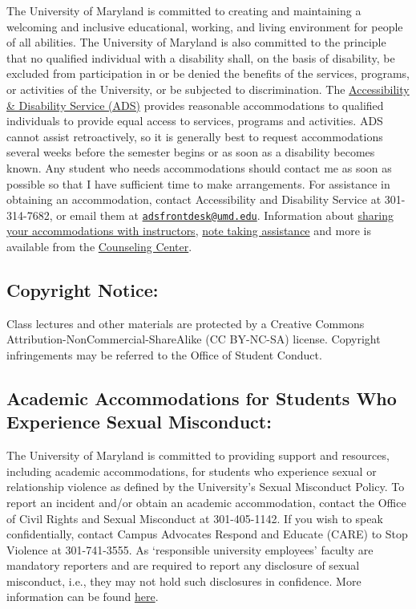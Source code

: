 \documentclass[
]{book}
\begin{document}
The University of Maryland is committed to creating and maintaining a welcoming and inclusive educational, working, and living environment for people of all abilities. The University of Maryland is also committed to the principle that no qualified individual with a disability shall, on the basis of disability, be excluded from participation in or be denied the benefits of the services, programs, or activities of the University, or be subjected to discrimination. The \href{https://www.counseling.umd.edu/ads/}{Accessibility \& Disability Service (ADS)} provides reasonable accommodations to qualified individuals to provide equal access to services, programs and activities. ADS cannot assist retroactively, so it is generally best to request accommodations several weeks before the semester begins or as soon as a disability becomes known. Any student who needs accommodations should contact me as soon as possible so that I have sufficient time to make arrangements. For assistance in obtaining an accommodation, contact Accessibility and Disability Service at 301-314-7682, or email them at \href{mailto:adsfrontdesk@umd.edu}{\nolinkurl{adsfrontdesk@umd.edu}}. Information about \href{https://www.counseling.umd.edu/ads/accommodations/sharingwithinstructors/}{sharing your accommodations with instructors}, \href{https://www.counseling.umd.edu/ads/notetaking/}{note taking assistance} and more is available from the \href{http://counseling.umd.edu/ads/}{Counseling Center}.

\hypertarget{copyright-notice}{%
\subsection{Copyright Notice:}\label{copyright-notice}}

Class lectures and other materials are protected by a Creative Commons Attribution-NonCommercial-ShareAlike (CC BY-NC-SA) license. Copyright infringements may be referred to the Office of Student Conduct.

\hypertarget{academic-accommodations-for-students-who-experience-sexual-misconduct}{%
\subsection{Academic Accommodations for Students Who Experience Sexual Misconduct:}\label{academic-accommodations-for-students-who-experience-sexual-misconduct}}

The University of Maryland is committed to providing support and resources, including academic accommodations, for students who experience sexual or relationship violence as defined by the University's Sexual Misconduct Policy. To report an incident and/or obtain an academic accommodation, contact the Office of Civil Rights and Sexual Misconduct at 301-405-1142. If you wish to speak confidentially, contact Campus Advocates Respond and Educate (CARE) to Stop Violence at 301-741-3555. As `responsible university employees' faculty are mandatory reporters and are required to report any disclosure of sexual misconduct, i.e., they may not hold such disclosures in confidence. More information can be found \href{http://www.umd.edu/ocrsm/}{here}.
\end{document}
